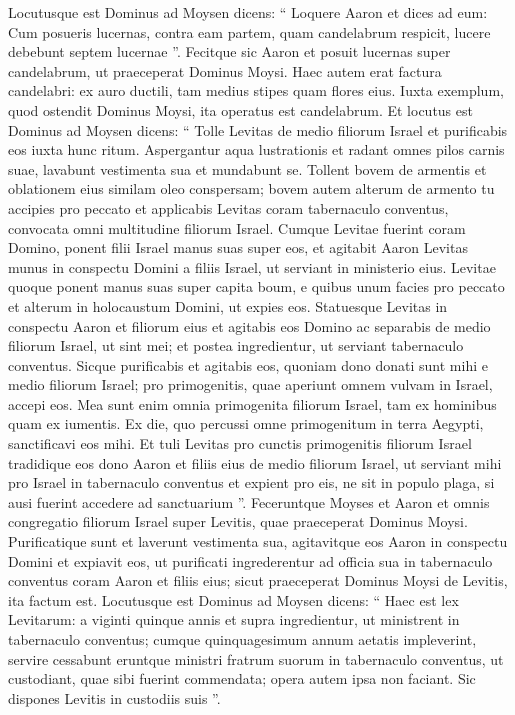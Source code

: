 \begin{biblechapter}
\begin{biblechapter}
\begin{biblechapter}
\begin{biblechapter}
\begin{biblechapter}
\begin{biblechapter}
\begin{biblechapter}
\begin{biblechapter}
\verse Locutusque est Dominus ad Moysen dicens: 
\verse “ Loquere Aaron et dices ad eum: Cum posueris lucernas, contra eam partem, quam candelabrum respicit, lucere debebunt septem lucernae ”. 
\verse Fecitque sic Aaron et posuit lucernas super candelabrum, ut praeceperat Dominus Moysi. 
\verse Haec autem erat factura candelabri: ex auro ductili, tam medius stipes quam flores eius. Iuxta exemplum, quod ostendit Dominus Moysi, ita operatus est candelabrum.
 \verse Et locutus est Dominus ad Moysen dicens: 
\verse “ Tolle Levitas de medio filiorum Israel et purificabis eos 
\verse iuxta hunc ritum. Aspergantur aqua lustrationis et radant omnes pilos carnis suae, lavabunt vestimenta sua et mundabunt se. 
\verse Tollent bovem de armentis et oblationem eius similam oleo conspersam; bovem autem alterum de armento tu accipies pro peccato 
\verse et applicabis Levitas coram tabernaculo conventus, convocata omni multitudine filiorum Israel.
 \verse Cumque Levitae fuerint coram Domino, ponent filii Israel manus suas super eos, 
\verse et agitabit Aaron Levitas munus in conspectu Domini a filiis Israel, ut serviant in ministerio eius. 
\verse Levitae quoque ponent manus suas super capita boum, e quibus unum facies pro peccato et alterum in holocaustum Domini, ut expies eos. 
\verse Statuesque Levitas in conspectu Aaron et filiorum eius et agitabis eos Domino 
\verse ac separabis de medio filiorum Israel, ut sint mei; 
 \verse et postea ingredientur, ut serviant tabernaculo conventus.
 Sicque purificabis et agitabis eos, 
\verse quoniam dono donati sunt mihi e medio filiorum Israel; pro primogenitis, quae aperiunt omnem vulvam in Israel, accepi eos. 
\verse Mea sunt enim omnia primogenita filiorum Israel, tam ex hominibus quam ex iumentis. Ex die, quo percussi omne primogenitum in terra Aegypti, sanctificavi eos mihi. 
\verse Et tuli Levitas pro cunctis primogenitis filiorum Israel 
\verse tradidique eos dono Aaron et filiis eius de medio filiorum Israel, ut serviant mihi pro Israel in tabernaculo conventus et expient pro eis, ne sit in populo plaga, si ausi fuerint accedere ad sanctuarium ”.
 \verse Feceruntque Moyses et Aaron et omnis congregatio filiorum Israel super Levitis, quae praeceperat Dominus Moysi. 
\verse Purificatique sunt et laverunt vestimenta sua, agitavitque eos Aaron in conspectu Domini et expiavit eos, ut purificati 
\verse ingrederentur ad officia sua in tabernaculo conventus coram Aaron et filiis eius; sicut praeceperat Dominus Moysi de Levitis, ita factum est.
 \verse Locutusque est Dominus ad Moysen dicens: 
\verse “ Haec est lex Levitarum: a viginti quinque annis et supra ingredientur, ut ministrent in tabernaculo conventus; 
\verse cumque quinquagesimum annum aetatis impleverint, servire cessabunt 
\verse eruntque ministri fratrum suorum in tabernaculo conventus, ut custodiant, quae sibi fuerint commendata; opera autem ipsa non faciant. Sic dispones Levitis in custodiis suis ”.
 

\end{biblechapter}
\end{biblechapter}
\end{biblechapter}
\end{biblechapter}
\end{biblechapter}
\end{biblechapter}
\end{biblechapter}
\end{biblechapter}
